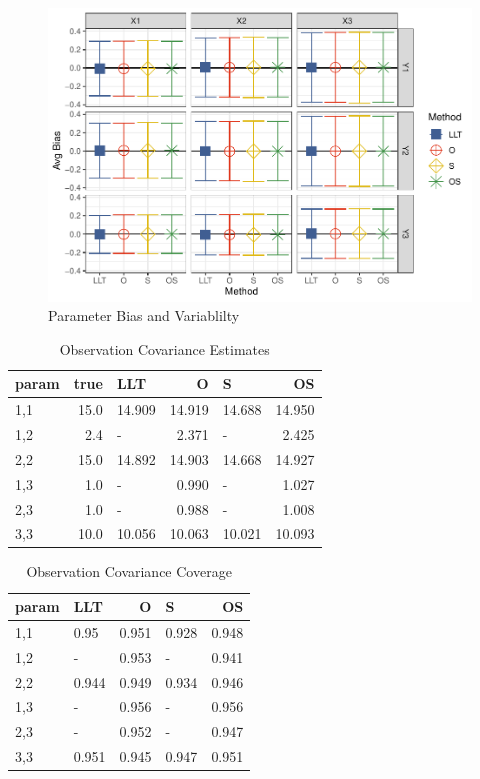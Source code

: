\documentclass[
]{article}
\begin{document}
\begin{figure}
\centering
\includegraphics{FullSimulation_files/figure-latex/unnamed-chunk-9-1.pdf}
\caption{\label{fig:unnamed-chunk-9}Parameter Bias and Variablilty}
\end{figure}

\begin{longtable}[t]{l|r|l|r|l|r}
\caption{\label{tab:unnamed-chunk-10}Observation Covariance Estimates}\\
\hline
param & true & LLT & O & S & OS\\
\hline
1,1 & 15.0 & 14.909 & 14.919 & 14.688 & 14.950\\
\hline
1,2 & 2.4 & - & 2.371 & - & 2.425\\
\hline
2,2 & 15.0 & 14.892 & 14.903 & 14.668 & 14.927\\
\hline
1,3 & 1.0 & - & 0.990 & - & 1.027\\
\hline
2,3 & 1.0 & - & 0.988 & - & 1.008\\
\hline
3,3 & 10.0 & 10.056 & 10.063 & 10.021 & 10.093\\
\hline
\end{longtable}

\begin{longtable}[t]{l|l|r|l|r}
\caption{\label{tab:unnamed-chunk-11}Observation Covariance Coverage}\\
\hline
param & LLT & O & S & OS\\
\hline
1,1 & 0.95 & 0.951 & 0.928 & 0.948\\
\hline
1,2 & - & 0.953 & - & 0.941\\
\hline
2,2 & 0.944 & 0.949 & 0.934 & 0.946\\
\hline
1,3 & - & 0.956 & - & 0.956\\
\hline
2,3 & - & 0.952 & - & 0.947\\
\hline
3,3 & 0.951 & 0.945 & 0.947 & 0.951\\
\hline
\end{longtable}
\end{document}
